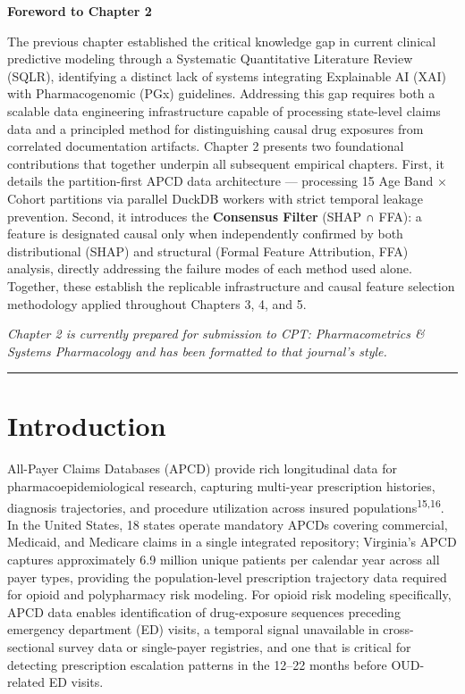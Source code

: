 \documentclass[
  12pt,
]{book}
\begin{document}
\textbf{Foreword to Chapter 2}

The previous chapter established the critical knowledge gap in current
clinical predictive modeling through a Systematic Quantitative
Literature Review (SQLR), identifying a distinct lack of systems
integrating Explainable AI (XAI) with Pharmacogenomic (PGx) guidelines.
Addressing this gap requires both a scalable data engineering
infrastructure capable of processing state-level claims data and a
principled method for distinguishing causal drug exposures from
correlated documentation artifacts. Chapter 2 presents two foundational
contributions that together underpin all subsequent empirical chapters.
First, it details the partition-first APCD data architecture ---
processing 15 Age Band × Cohort partitions via parallel DuckDB workers
with strict temporal leakage prevention. Second, it introduces the
\textbf{Consensus Filter} (SHAP ∩ FFA): a feature is designated causal
only when independently confirmed by both distributional (SHAP) and
structural (Formal Feature Attribution, FFA) analysis, directly
addressing the failure modes of each method used alone. Together, these
establish the replicable infrastructure and causal feature selection
methodology applied throughout Chapters 3, 4, and 5.

\emph{Chapter 2 is currently prepared for submission to CPT:
Pharmacometrics \& Systems Pharmacology and has been formatted to that
journal's style.}

\begin{center}\rule{0.5\linewidth}{0.5pt}\end{center}

\chapter{Introduction}\label{sec-intro}

All-Payer Claims Databases (APCD) provide rich longitudinal data for
pharmacoepidemiological research, capturing multi-year prescription
histories, diagnosis trajectories, and procedure utilization across
insured populations\textsuperscript{15,16}. In the United States, 18
states operate mandatory APCDs covering commercial, Medicaid, and
Medicare claims in a single integrated repository; Virginia's APCD
captures approximately 6.9 million unique patients per calendar year
across all payer types, providing the population-level prescription
trajectory data required for opioid and polypharmacy risk modeling. For
opioid risk modeling specifically, APCD data enables identification of
drug-exposure sequences preceding emergency department (ED) visits, a
temporal signal unavailable in cross-sectional survey data or
single-payer registries, and one that is critical for detecting
prescription escalation patterns in the 12--22 months before OUD-related
ED visits.
\end{document}
